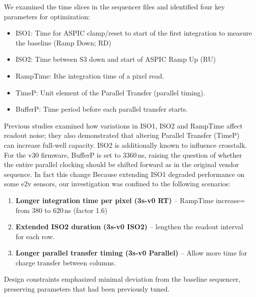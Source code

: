 We examined the time slices in the sequencer files and identified four key parameters for optimization:

\begin{itemize}
\item ISO1: Time for ASPIC clamp/reset to start of the first integration to measure the baseline (Ramp Down; RD)
\item ISO2: Time between S3 down and start of ASPIC Ramp Up (RU)
\item RampTime: Ithe integration time of a pixel read.
\item TimeP: Unit element of the Parallel Transfer (parallel timing).
\item BufferP: Time period before each parallel transfer starts. 
\end{itemize}

Previous studies \citep{10.1117/12.3019117,2024SPIE13103E..21S} examined how variations in ISO1, ISO2 and RampTime affect readout noise; they also demonstrated that altering Parallel Transfer (TimeP) can increase full-well capacity. ISO2 is additionally known to influence crosstalk.
For the v30 firmware, BufferP is set to 3360\,ns, raising the question of whether the entire parallel clocking should be shifted forward as in the original vendor sequence. In fact this change 
Because extending ISO1 degraded performance on some e2v sensors, our investigation was confined to the following scenarios: 
\begin{enumerate}
    \item \textbf{Longer integration time per pixel (3s-v0 RT)} – RampTime increase= from 380 to 620\,ns (factor 1.6)
    \item \textbf{Extended ISO2 duration (3s-v0 ISO2)} – lengthen the readout interval for each row.
    \item \textbf{Longer parallel transfer timing (3s-v0 Parallel)} – Allow more time for charge transfer between columns.
\end{enumerate}
Design constraints emphasized minimal deviation from the baseline sequencer, preserving parameters that had been previously tuned. 

